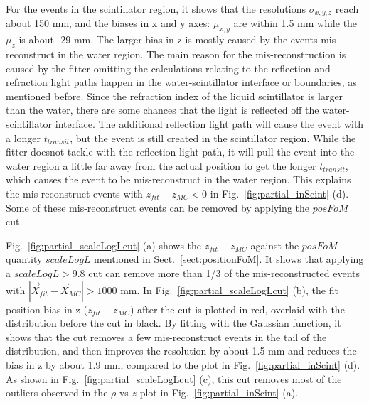 For the events in the scintillator region, it shows that the resolutions $\sigma_{x,y,z}$ reach about 150 mm, and the biases in x and y axes: $\mu_{x,y}$ are within 1.5 mm while the $\mu_z$ is about -29 mm. The larger bias in z is mostly caused by the events mis-reconstruct in the water region. The main reason for the mis-reconstruction is caused by the fitter omitting the calculations relating to the reflection and refraction light paths happen in the water-scintillator interface or boundaries, as mentioned before. Since the refraction index of the liquid scintillator is larger than the water, there are some chances that the light is reflected off the water-scintillator interface. The additional reflection light path will cause the event with a longer $t_{transit}$, but the event is still created in the scintillator region. While the fitter doesnot tackle with the reflection light path, it will pull the event into the water region a little far away from the actual position to get the longer $t_{transit}$, which causes the event to be mis-reconstruct in the water region. This explains the mis-reconstruct events with $z_{fit}-z_{MC}<0$ in Fig.~\ref{fig:partial_inScint} (d). Some of these mis-reconstruct events can be removed by applying the $posFoM$ cut.

Fig.~\ref{fig:partial_scaleLogLcut} (a) shows the $z_{fit}-z_{MC}$ against the $posFoM$ quantity $scaleLogL$ mentioned in Sect.~\ref{sect:positionFoM}. It shows that applying a $scaleLogL>9.8$ cut can remove more than 1/3 of the mis-reconstructed events with $|\vec{X}_{fit}-\vec{X}_{MC}|>1000$ mm. In Fig.~\ref{fig:partial_scaleLogLcut} (b), the fit position bias in z ($z_{fit}-z_{MC}$) after the cut is plotted in red, overlaid with the distribution before the cut in black. By fitting with the Gaussian function, it shows that the cut removes a few mis-reconstruct events in the tail of the distribution, and then improves the resolution by about 1.5 mm and reduces the bias in z by about 1.9 mm, compared to the plot in Fig.~\ref{fig:partial_inScint} (d). As shown in Fig.~\ref{fig:partial_scaleLogLcut} (c), this cut removes most of the outliers observed in the $\rho$ vs $z$ plot in Fig.~\ref{fig:partial_inScint} (a).

